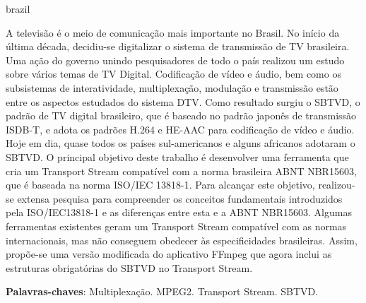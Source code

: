 \documentclass[
	12pt,				%
	openright,			%
	twoside,			%
	a4paper,			%
	brazil,
	french,				%
	english
	]{abntex2}
\begin{document}
\setlength{\absparsep}{18pt} %
\begin{resumo}[Resumo]
 \begin{otherlanguage*}{brazil}
	

A televisão é o meio de comunicação mais importante no Brasil. No início da última década, decidiu-se digitalizar o sistema de transmissão de TV brasileira. Uma ação do governo unindo pesquisadores de todo o país realizou um estudo sobre vários temas de TV Digital. Codificação de vídeo e áudio, bem como os subsistemas de interatividade, multiplexação, modulação e transmissão estão entre os aspectos estudados do sistema DTV. Como resultado surgiu o SBTVD, o padrão de TV digital brasileiro, que é baseado no padrão japonês de transmissão ISDB-T, e adota os padrões H.264 e HE-AAC para codificação de vídeo e áudio. Hoje em dia, quase todos os países sul-americanos e alguns africanos adotaram o SBTVD. O principal objetivo deste trabalho é desenvolver uma ferramenta que cria um Transport Stream compatível com a norma brasileira ABNT NBR15603, que é baseada na norma ISO/IEC 13818-1. Para alcançar este objetivo, realizou-se extensa pesquisa para compreender os conceitos fundamentais introduzidos pela ISO/IEC13818-1 e as diferenças entre esta e a ABNT NBR15603. Algumas ferramentas existentes geram um Transport Stream compatível com as normas internacionais, mas não conseguem obedecer às especificidades brasileiras. Assim, propõe-se uma versão modificada do aplicativo FFmpeg que agora inclui as estruturas obrigatórias do SBTVD no Transport Stream.

 \textbf{Palavras-chaves}: Multiplexação. MPEG2. Transport Stream. SBTVD.
 \end{otherlanguage*}
\end{resumo}
\end{document}
